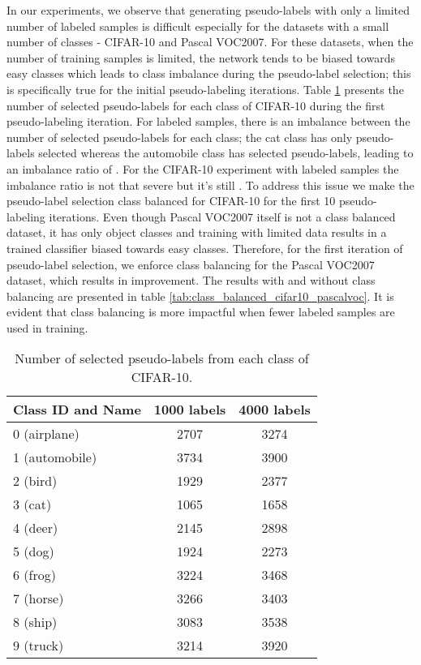 \documentclass{article} \usepackage{iclr2021_conference,times}
\begin{document}
In our experiments, we observe that generating pseudo-labels with only a limited number of labeled samples is difficult especially for the datasets with a small number of classes -  CIFAR-10 and Pascal VOC2007. For these datasets, when the number of training samples is limited, the network tends to be biased towards easy classes which leads to class imbalance during the pseudo-label selection; this is specifically true for the initial pseudo-labeling iterations. Table \ref{tab:per_class_selection} presents the number of selected pseudo-labels for each class of CIFAR-10 during the first pseudo-labeling iteration. For  labeled samples, there is an imbalance between the number of selected pseudo-labels for each class; the cat class has only  pseudo-labels selected whereas the automobile class has  selected pseudo-labels, leading to an imbalance ratio of . For the CIFAR-10 experiment with  labeled samples the imbalance ratio is not that severe but it's still . To address this issue we make the pseudo-label selection class balanced for CIFAR-10 for the first 10 pseudo-labeling iterations. Even though Pascal VOC2007 itself is not a class balanced dataset, it has only  object classes and training with limited data results in a trained classifier biased towards easy classes. Therefore, for the first iteration of pseudo-label selection, we enforce class balancing for the Pascal VOC2007 dataset, which results in improvement. The results with and without class balancing are presented in table \ref{tab:class_balanced_cifar10_pascalvoc}. It is evident that class balancing is more impactful when fewer labeled samples are used in training.


\begin{table}[h]
\caption{Number of selected pseudo-labels from each class of CIFAR-10.}
\begin{center}
\label{tab:per_class_selection}
\small
\begin{tabular}{l|cc}
\hline
Class ID and Name & 1000 labels & 4000 labels \\ \hline
0 (airplane)  &  2707 & 3274 \\ 
1 (automobile) & 3734 & 3900  \\
2 (bird) & 1929 & 2377 \\ 
3 (cat) & 1065 & 1658 \\ 
4 (deer) & 2145 & 2898 \\ 
5 (dog) & 1924 & 2273 \\ 
6 (frog) & 3224 & 3468 \\ 
7 (horse) & 3266 & 3403 \\ 
8 (ship) & 3083 & 3538 \\ 
9 (truck) & 3214 & 3920 \\ 
\hline
\end{tabular}
\end{center}
\end{table}
\end{document}
